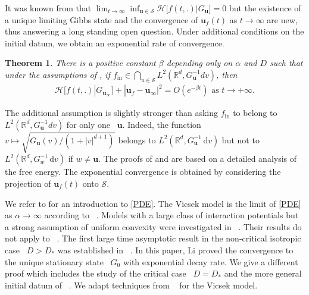 \documentclass[reqno]{amsart} %
\newtheorem{theorem}{Theorem}[section]
\begin{document}
It was known from \cite{Li2021} that $\lim_{t\rightarrow \infty} \inf_{\mathbf{u}\in \mathcal{S}}{\mathcal{H}\big[ f(t,.)|G_\mathbf{u}\big]}=0$ but the existence of a unique limiting Gibbs state and the convergence of $\mathbf{u}_{f}(t)$ as $t\rightarrow \infty$ are new, thus answering a long standing open question. Under additional conditions on the initial datum, we obtain an exponential rate of convergence.


\begin{theorem}{}
\label{thm3}
There is a positive constant $\beta$ depending only on $\alpha$ and $D$ such that under the assumptions of , if $f_{\mathrm{in}} \in \bigcap_{u \in \mathcal{S}} L^2(\mathbb{R}^d,G_\mathbf{u}^{-1}dv)$, then
     \begin{align*}
         \mathcal{H}\big[f(t,.)|G_{\mathbf{u}_{\infty}}\big] +|\mathbf{u}_{f}-\mathbf{u}_{\infty}|^2 =O(e^{-\beta t}) \text{ as } t\rightarrow +\infty.
     \end{align*}
\end{theorem}
The additional assumption is slightly stronger than asking $f_{\mathrm{in}}$ to belong to $ L^2(\mathbb{R}^d,G_\mathbf{u}^{-1}dv)$ for only one~ $\mathbf{u}$. Indeed, the function 
 $v \mapsto \sqrt{G_\mathbf{u}(v) /\left(1 + |v|^{d+1}\right)^{}}$ belongs to $L^2(\mathbb{R}^d, G_\mathbf{u}^{-1}\, \mathrm{d}v)$ but not to~$ L^2(\mathbb{R}^d, G_w^{-1}\, \mathrm{d}v)$ if $w \neq \mathbf{u}$.
The proofs of  and  are based on a detailed analysis of the free energy. The exponential convergence is obtained by considering the projection of $\mathbf{u}_{f}(t)$ onto $\mathcal{S}$.

\indent
We refer to \cite{BarbaroCanizoDegondphasetransi} for an introduction to \eqref{PDE}. The Vicsek model \cite{Vicsek1995} is the limit of \eqref{PDE} as $\alpha \rightarrow \infty$ according to ~\cite{bostan2013asymptotic}. Models with a large class of interaction potentials but a strong assumption of uniform convexity were investigated in ~\cite{carrillo2003kinetic}. Their results do not apply to ~. The first large time asymptotic result in the non-critical isotropic case ~$D>D_*$ was established in ~\cite{Li2021}. In this paper, Li proved the convergence to the unique stationary state ~$G_0$ with exponential decay rate. We give a different proof  which includes the study of the critical case ~$D=D_*$ and the more general initial datum of~ .
 We adapt techniques from ~\cite{Frouvelle2021,FrouvelleLIU2012} for the Vicsek model.
 
\end{document}

